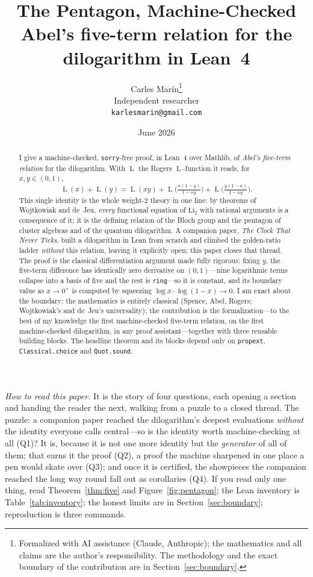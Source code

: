 \documentclass[11pt]{article}
\title{\bf The Pentagon, Machine-Checked\\[4pt]
  \large\normalfont Abel's five-term relation for the dilogarithm in Lean~4}
\author{Carles Mar\'in\thanks{Formalized with AI assistance (Claude, Anthropic); the
mathematics and all claims are the author's responsibility. The methodology and the exact
boundary of the contribution are in Section~\ref{sec:boundary}.}\\[3pt]
  \normalsize Independent researcher\\
  \normalsize \texttt{karlesmarin@gmail.com}}
\date{June 2026}
\newcommand{\lean}[1]{\texttt{#1}}
\newcommand{\Li}{\mathrm{Li}_2}
\DeclareMathOperator{\Lrog}{L}
\begin{document}
\maketitle

\begin{abstract}
I give a machine-checked, \lean{sorry}-free proof, in Lean~4 over Mathlib, of \emph{Abel's
five-term relation} for the dilogarithm. With $\Lrog$ the Rogers $\Lrog$-function it reads,
for $x,y\in(0,1)$,
\[
  \Lrog(x)+\Lrog(y)=\Lrog(xy)+\Lrog\!\Big(\tfrac{x(1-y)}{1-xy}\Big)
    +\Lrog\!\Big(\tfrac{y(1-x)}{1-xy}\Big).
\]
This single identity is the whole weight-2 theory in one line: by theorems of Wojtkowiak
and de~Jeu, \emph{every} functional equation of $\Li$ with rational arguments is a
consequence of it; it is the defining relation of the Bloch group and the pentagon of
cluster algebras and of the quantum dilogarithm. A companion paper, \emph{The Clock That
Never Ticks}, built a dilogarithm in Lean from scratch and climbed the golden-ratio ladder
\emph{without} this relation, leaving it explicitly open; this paper closes that thread.
The proof is the classical differentiation argument made fully rigorous: fixing $y$, the
five-term difference has identically zero derivative on $(0,1)$---nine logarithmic terms
collapse into a basis of five and the rest is \lean{ring}---so it is constant, and its
boundary value as $x\to0^+$ is computed by squeezing $\log x\cdot\log(1-x)\to0$. I am exact
about the boundary: the mathematics is entirely classical (Spence, Abel, Rogers;
Wojtkowiak's and de~Jeu's universality); the contribution is the formalization---to the
best of my knowledge the first machine-checked five-term relation, on the first
machine-checked dilogarithm, in any proof assistant---together with three reusable building
blocks. The headline theorem and its blocks depend only on \lean{propext},
\lean{Classical.choice} and \lean{Quot.sound}.
\end{abstract}

\medskip
\noindent\emph{How to read this paper.} It is the story of four questions, each opening a
section and handing the reader the next, walking from a puzzle to a closed thread. The
puzzle: a companion paper reached the dilogarithm's deepest evaluations \emph{without} the
identity everyone calls central---so is the identity worth machine-checking at all
(Q1)? It is, because it is not one more identity but the \emph{generator} of all of them;
that earns it the proof (Q2), a proof the machine sharpened in one place a pen would skate
over (Q3); and once it is certified, the showpieces the companion reached the long way round
fall out as corollaries (Q4). If you read only one thing, read Theorem~\ref{thm:five} and
Figure~\ref{fig:pentagon}; the Lean inventory is Table~\ref{tab:inventory}; the honest
limits are in Section~\ref{sec:boundary}; reproduction is three commands.
\end{document}
